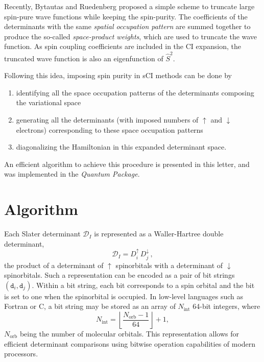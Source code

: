 \documentclass[aip,jcp,reprint,showkeys]{revtex4-1}
\newcommand{\stwo}{\hat{S}^2}
\newcommand{\md}{\mathtt{d}}
\newcommand{\mD}{\mathcal{D}}
\newcommand{\up}{\uparrow}
\newcommand{\dn}{\downarrow}
\newcommand{\Nint}{{N_\text{int}}}
\newcommand{\Norb}{{N_\text{orb}}}
\newcommand{\sop}{spatial occupation pattern}
\begin{document}
Recently, Bytautas and Ruedenberg proposed a simple scheme to truncate large
spin-pure wave functions while keeping the spin-purity.\cite{Bytautas_2007} The
coefficients of the determinants with the same \emph{\sop}
are summed together to produce the so-called \emph{space-product
weights}, which are used to truncate the wave function. As spin coupling
coefficients are included in the CI expansion, the truncated wave function is
also an eigenfunction of $\stwo$.

Following this idea, imposing spin purity in sCI methods can be done by 
\begin{enumerate}
\item identifying all the space occupation patterns of the determinants composing
      the variational space
\item generating all the determinants (with imposed numbers of $\up$ and
      $\dn$ electrons) corresponding to these space occupation patterns
\item diagonalizing the Hamiltonian in this expanded determinant space.
\end{enumerate}
An efficient algorithm to achieve this procedure is presented in this letter,
and was implemented in the \emph{Quantum Package}.\cite{qp}

\section{Algorithm}

Each Slater determinant $\mD_I$ is represented as a Waller-Hartree double
determinant,\cite{Pauncz_1989}
\begin{equation}
 \label{eq:di}
 \mD_I = D_i^\up \, D_j^\dn\, ,
\end{equation}
the product of a determinant of
$\up$ spinorbitals with a determinant of $\dn$ spinorbitals.
Such a representation can be encoded as a pair of bit strings $(\md_i,\md_j)$.
Within a bit string,
each bit corresponds to a spin orbital and the bit is set to one when the
spinorbital is occupied. In low-level languages such as Fortran or C, a bit
string may be stored as an array of $\Nint$ 64-bit integers, where 
\begin{equation}
  \Nint = \left \lfloor \frac{\Norb-1}{64} \right \rfloor + 1,
\end{equation}
$\Norb$ being the number of molecular orbitals.
This representation
allows for efficient determinant comparisons using bitwise operation 
capabilities of modern processors.\cite{Scemama_2013}
\end{document}

